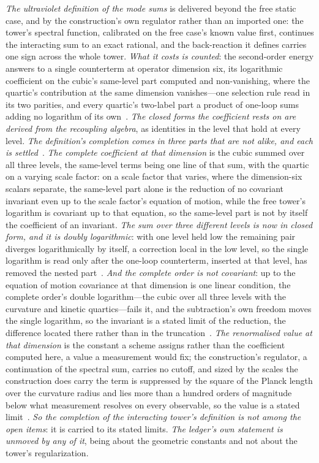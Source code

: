 \documentclass[11pt,a4paper]{article}
\theoremstyle{plain}
\theoremstyle{definition}
\begin{document}
\emph{The ultraviolet definition of the mode sums} is delivered beyond the free static case, and by the
construction's own regulator rather than an imported one: the tower's spectral function, calibrated on the free
case's known value first, continues the interacting sum to an exact rational, and the back-reaction it defines
carries one sign across the whole tower. \emph{What it costs is counted}: the second-order energy answers to a
single counterterm at operator dimension six, its logarithmic coefficient on the cubic's same-level part computed
and non-vanishing, where the quartic's contribution at the same dimension vanishes---one selection rule read in its
two parities, and every quartic's two-label part a product of one-loop sums adding no logarithm of its
own~\cite{JanzenCanonicalTime}. \emph{The closed forms the coefficient rests on are derived from the
recoupling algebra}, as identities in the level that hold at every level. \emph{The definition's
completion comes in three parts that are not alike, and each is settled}~\cite{JanzenCanonicalTime}. \emph{The complete
coefficient at that dimension} is the cubic summed over all three levels, the same-level terms being one line of
that sum, with the quartic on a varying scale factor: on a scale factor that varies, where the dimension-six scalars separate, the
same-level part alone is the reduction of no covariant invariant even up to the scale factor's equation of
motion, while the free tower's logarithm is covariant up to that equation, so the same-level part is not by
itself the coefficient of an invariant. \emph{The sum over three different levels is now in closed form, and
it is doubly logarithmic}: with one level held low the remaining pair diverges logarithmically by itself, a
correction local in the low level, so the single logarithm is read only after the one-loop counterterm, inserted
at that level, has removed the nested part~\cite{JanzenCanonicalTime}. \emph{And the complete order is not covariant}: up
to the equation of motion covariance at that dimension is one linear condition, the complete order's double
logarithm---the cubic over all three levels with the curvature and kinetic quartics---fails it, and the
subtraction's own freedom moves the single logarithm, so the invariant is a stated limit of the reduction, the
difference located there rather than in the truncation~\cite{JanzenCanonicalTime}. \emph{The renormalised value at that
dimension} is the constant a scheme assigns rather than the coefficient computed here, a value a measurement would
fix; the construction's regulator, a continuation of the spectral sum, carries no cutoff, and sized by the scales
the construction does carry the term is suppressed by the square of the Planck length over the curvature radius and
lies more than a hundred orders of magnitude below what measurement resolves on every observable, so the value is a
stated limit~\cite{JanzenCanonicalTime}. \emph{So the completion of the interacting tower's definition is not among
the open items}: it is carried to its stated limits. \emph{The
ledger's own statement is unmoved by any of it}, being about the geometric constants and not about the
tower's regularization.
\end{document}
